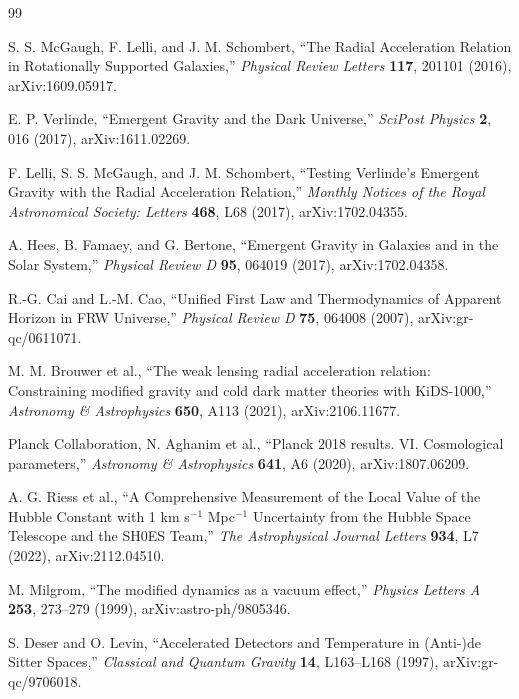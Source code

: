 \documentclass[12pt]{article}
\begin{document}
\begin{thebibliography}{99}
\small
{}
\raggedright
{}

S. S. McGaugh, F. Lelli, and J. M. Schombert,
``The Radial Acceleration Relation in Rotationally Supported Galaxies,''
\emph{Physical Review Letters} \textbf{117}, 201101 (2016),
arXiv:1609.05917.

E. P. Verlinde,
``Emergent Gravity and the Dark Universe,''
\emph{SciPost Physics} \textbf{2}, 016 (2017),
arXiv:1611.02269.

F. Lelli, S. S. McGaugh, and J. M. Schombert,
``Testing Verlinde's Emergent Gravity with the Radial Acceleration Relation,''
\emph{Monthly Notices of the Royal Astronomical Society: Letters} \textbf{468}, L68 (2017),
arXiv:1702.04355.

A. Hees, B. Famaey, and G. Bertone,
``Emergent Gravity in Galaxies and in the Solar System,''
\emph{Physical Review D} \textbf{95}, 064019 (2017),
arXiv:1702.04358.

R.-G. Cai and L.-M. Cao,
``Unified First Law and Thermodynamics of Apparent Horizon in FRW Universe,''
\emph{Physical Review D} \textbf{75}, 064008 (2007),
arXiv:gr-qc/0611071.

M. M. Brouwer et al.,
``The weak lensing radial acceleration relation: Constraining modified gravity and cold dark matter theories with KiDS-1000,''
\emph{Astronomy \& Astrophysics} \textbf{650}, A113 (2021),
arXiv:2106.11677.

Planck Collaboration, N. Aghanim et al.,
``Planck 2018 results. VI. Cosmological parameters,''
\emph{Astronomy \& Astrophysics} \textbf{641}, A6 (2020),
arXiv:1807.06209.

A. G. Riess et al.,
``A Comprehensive Measurement of the Local Value of the Hubble Constant with 1 km s$^{-1}$ Mpc$^{-1}$ Uncertainty from the Hubble Space Telescope and the SH0ES Team,''
\emph{The Astrophysical Journal Letters} \textbf{934}, L7 (2022),
arXiv:2112.04510.

M. Milgrom,
``The modified dynamics as a vacuum effect,''
\emph{Physics Letters A} \textbf{253}, 273--279 (1999),
arXiv:astro-ph/9805346.

S. Deser and O. Levin,
``Accelerated Detectors and Temperature in (Anti-)de Sitter Spaces,''
\emph{Classical and Quantum Gravity} \textbf{14}, L163--L168 (1997),
arXiv:gr-qc/9706018.


\end{thebibliography}
\end{document}
